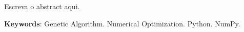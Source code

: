 Escreva o abstract aqui.

\vspace{\onelineskip}\noindent
\textbf{Keywords}: Genetic Algorithm. Numerical Optimization. Python. NumPy.
